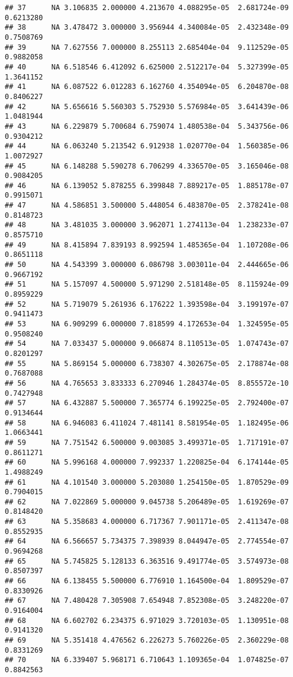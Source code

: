 \documentclass[]{article}
\begin{document}
\begin{verbatim}
## 37      NA 3.106835 2.000000 4.213670 4.088295e-05  2.681724e-09 0.6213280
## 38      NA 3.478472 3.000000 3.956944 4.340084e-05  2.432348e-09 0.7508769
## 39      NA 7.627556 7.000000 8.255113 2.685404e-04  9.112529e-05 0.9882058
## 40      NA 6.518546 6.412092 6.625000 2.512217e-04  5.327399e-05 1.3641152
## 41      NA 6.087522 6.012283 6.162760 4.354094e-05  6.204870e-08 0.8406227
## 42      NA 5.656616 5.560303 5.752930 5.576984e-05  3.641439e-06 1.0481944
## 43      NA 6.229879 5.700684 6.759074 1.480538e-04  5.343756e-06 0.9304212
## 44      NA 6.063240 5.213542 6.912938 1.020770e-04  1.560385e-06 1.0072927
## 45      NA 6.148288 5.590278 6.706299 4.336570e-05  3.165046e-08 0.9084205
## 46      NA 6.139052 5.878255 6.399848 7.889217e-05  1.885178e-07 0.9915071
## 47      NA 4.586851 3.500000 5.448054 6.483870e-05  2.378241e-08 0.8148723
## 48      NA 3.481035 3.000000 3.962071 1.274113e-04  1.238233e-07 0.8575710
## 49      NA 8.415894 7.839193 8.992594 1.485365e-04  1.107208e-06 0.8651118
## 50      NA 4.543399 3.000000 6.086798 3.003011e-04  2.444665e-06 0.9667192
## 51      NA 5.157097 4.500000 5.971290 2.518148e-05  8.115924e-09 0.8959229
## 52      NA 5.719079 5.261936 6.176222 1.393598e-04  3.199197e-07 0.9411473
## 53      NA 6.909299 6.000000 7.818599 4.172653e-04  1.324595e-05 0.9508240
## 54      NA 7.033437 5.000000 9.066874 8.110513e-05  1.074743e-07 0.8201297
## 55      NA 5.869154 5.000000 6.738307 4.302675e-05  2.178874e-08 0.7687088
## 56      NA 4.765653 3.833333 6.270946 1.284374e-05  8.855572e-10 0.7427948
## 57      NA 6.432887 5.500000 7.365774 6.199225e-05  2.792400e-07 0.9134644
## 58      NA 6.946083 6.411024 7.481141 8.581954e-05  1.182495e-06 1.0663441
## 59      NA 7.751542 6.500000 9.003085 3.499371e-05  1.717191e-07 0.8611271
## 60      NA 5.996168 4.000000 7.992337 1.220825e-04  6.174144e-05 1.4988249
## 61      NA 4.101540 3.000000 5.203080 1.254150e-05  1.870529e-09 0.7904015
## 62      NA 7.022869 5.000000 9.045738 5.206489e-05  1.619269e-07 0.8148420
## 63      NA 5.358683 4.000000 6.717367 7.901171e-05  2.411347e-08 0.8552935
## 64      NA 6.566657 5.734375 7.398939 8.044947e-05  2.774554e-07 0.9694268
## 65      NA 5.745825 5.128133 6.363516 9.491774e-05  3.574973e-08 0.8507397
## 66      NA 6.138455 5.500000 6.776910 1.164500e-04  1.809529e-07 0.8330926
## 67      NA 7.480428 7.305908 7.654948 7.852308e-05  3.248220e-07 0.9164004
## 68      NA 6.602702 6.234375 6.971029 3.720103e-05  1.130951e-08 0.9141320
## 69      NA 5.351418 4.476562 6.226273 5.760226e-05  2.360229e-08 0.8331269
## 70      NA 6.339407 5.968171 6.710643 1.109365e-04  1.074825e-07 0.8842563

\end{verbatim}
\end{document}
